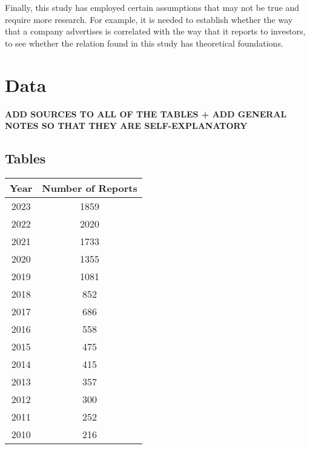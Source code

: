 \documentclass[12pt]{article}
\begin{document}
Finally, this study has employed certain assumptions that may not be true and require more research. For example, it is needed to establish whether the way that a company advertises is correlated with the way that it reports to investors, to see whether the relation found in this study has theoretical foundations. 



\pagebreak
\printbibliography{}
\pagebreak
\appendix

\section{Data}\label{app:data}

\textbf{ADD SOURCES TO ALL OF THE TABLES + ADD GENERAL NOTES SO THAT THEY ARE SELF-EXPLANATORY}

\subsection{Tables}\label{app:data:tabs}
\small
\centering

\begin{table}[h]
    \label{tab:sust_reps}
    \centering
        \begin{tabular}{cc}
            \toprule
            Year & Number of Reports\\
            \midrule
            2023 & 1859\\
            2022 & 2020\\
            2021 & 1733\\
            2020 & 1355\\
            2019 & 1081\\
            2018 & 852\\
            2017 & 686\\
            2016 & 558\\
            2015 & 475\\
            2014 & 415\\
            2013 & 357\\
            2012 & 300\\
            2011 & 252\\
            2010 & 216\\
            \bottomrule
        \end{tabular}
\end{table}
\end{document}
